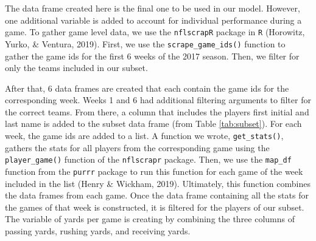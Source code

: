 \documentclass[12pt,twoside]{reedthesis}
\newenvironment{Shaded}{\begin{snugshade}}{\end{snugshade}}
\newcommand{\KeywordTok}[1]{\textcolor[rgb]{0.13,0.29,0.53}{\textbf{#1}}}
\newcommand{\DataTypeTok}[1]{\textcolor[rgb]{0.13,0.29,0.53}{#1}}
\newcommand{\DecValTok}[1]{\textcolor[rgb]{0.00,0.00,0.81}{#1}}
\newcommand{\StringTok}[1]{\textcolor[rgb]{0.31,0.60,0.02}{#1}}
\newcommand{\CommentTok}[1]{\textcolor[rgb]{0.56,0.35,0.01}{\textit{#1}}}
\newcommand{\OperatorTok}[1]{\textcolor[rgb]{0.81,0.36,0.00}{\textbf{#1}}}
\newcommand{\NormalTok}[1]{#1}
\begin{document}
The data frame created here is the final one to be used in our model.
However, one additional variable is added to account for individual
performance during a game. To gather game level data, we use the
\texttt{nflscrapR} package in \texttt{R} (Horowitz, Yurko, \& Ventura,
2019). First, we use the \texttt{scrape\_game\_ids()} function to gather
the game ids for the first 6 weeks of the 2017 season. Then, we filter
for only the teams included in our subset.

\small
\begin{Shaded}
\end{Shaded}
\normalsize

After that, 6 data frames are created that each contain the game ids for
the corresponding week. Weeks 1 and 6 had additional filtering arguments
to filter for the correct teams. From there, a column that includes the
players first initial and last name is added to the subset data frame
(from Table \ref{tab:subset}). For each week, the game ids are added to
a list. A function we wrote, \texttt{get\_stats()}, gathers the stats
for all players from the corresponding game using the
\texttt{player\_game()} function of the \texttt{nflscrapr} package.
Then, we use the \texttt{map\_df} function from the \texttt{purrr}
package to run this function for each game of the week included in the
list (Henry \& Wickham, 2019). Ultimately, this function combines the
data frames from each game. Once the data frame containing all the stats
for the games of that week is constructed, it is filtered for the
players of our subset. The variable of yards per game is creating by
combining the three columns of passing yards, rushing yards, and
receiving yards.
\end{document}
